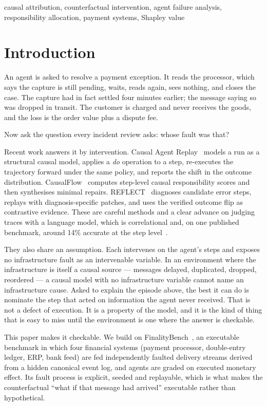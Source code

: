 \documentclass[conference]{IEEEtran}
\begin{document}
\begin{IEEEkeywords}
causal attribution, counterfactual intervention, agent failure analysis,
responsibility allocation, payment systems, Shapley value
\end{IEEEkeywords}

\section{Introduction}

An agent is asked to resolve a payment exception. It reads the processor, which
says the capture is still pending, waits, reads again, sees nothing, and closes
the case. The capture had in fact settled four minutes earlier; the message
saying so was dropped in transit. The customer is charged and never receives
the goods, and the loss is the order value plus a dispute fee.

Now ask the question every incident review asks: whose fault was that?

Recent work answers it by intervention. Causal Agent Replay~\cite{car} models a
run as a structural causal model, applies a \emph{do} operation to a step,
re-executes the trajectory forward under the same policy, and reports the shift
in the outcome distribution. CausalFlow~\cite{causalflow} computes
step-level causal responsibility scores and then synthesises minimal repairs.
REFLECT~\cite{reflect} diagnoses candidate error steps, replays with
diagnosis-specific patches, and uses the verified outcome flip as contrastive
evidence. These are careful methods and a clear advance on judging traces with
a language model, which is correlational and, on one published benchmark,
around 14\% accurate at the step level~\cite{car}.

They also share an assumption. Each intervenes on the agent's steps and
exposes no infrastructure fault as an intervenable variable. In an environment
where the infrastructure is itself a causal source --- messages delayed,
duplicated, dropped, reordered --- a causal model with no infrastructure
variable cannot name an infrastructure cause. Asked to
explain the episode above, the best it can do is nominate the step that acted
on information the agent never received. That is not a defect of execution. It
is a property of the model, and it is the kind of thing that is easy to miss
until the environment is one where the answer is checkable.

This paper makes it checkable. We build on FinalityBench~\cite{finalitybench},
an executable benchmark in which four financial systems (payment processor, double-entry ledger, ERP,
bank feed) are fed independently faulted delivery streams derived from a hidden canonical event log, and agents are graded on
executed monetary effect. Its fault process is explicit, seeded and replayable,
which is what makes the counterfactual ``what if that message had arrived''
executable rather than hypothetical.
\end{document}
